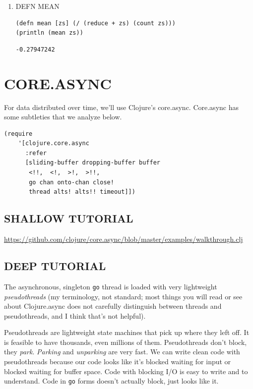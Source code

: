 \documentclass[10pt,oneside,x11names]{article}
\begin{document}
\begin{enumerate}
\item DEFN MEAN
\label{sec:org640de65}

\begin{verbatim}
(defn mean [zs] (/ (reduce + zs) (count zs)))
(println (mean zs))
\end{verbatim}

\begin{verbatim}
-0.27947242
\end{verbatim}
\end{enumerate}

\section{CORE.ASYNC}
\label{core.async}
For data distributed over time, we'll use Clojure's core.async.
Core.async has some subtleties that we analyze below.

\begin{verbatim}
(require
    '[clojure.core.async
      :refer
      [sliding-buffer dropping-buffer buffer
       <!!,  <!,  >!,  >!!,
       go chan onto-chan close!
       thread alts! alts!! timeout]])
\end{verbatim}

\subsection{SHALLOW TUTORIAL}
\label{shallow-tutorial}
\url{https://github.com/clojure/core.async/blob/master/examples/walkthrough.clj}

\subsection{DEEP TUTORIAL}
\label{deep-tutorial}
The asynchronous, singleton \texttt{go} thread is loaded with very lightweight
\emph{pseudothreads} (my terminology, not standard; most things you will read
or see about Clojure.async does not carefully distinguish between
threads and pseudothreads, and I think that's not helpful).

Pseudothreads are lightweight state machines that pick up where they
left off. It is feasible to have thousands, even millions of them.
Pseudothreads don't block, they \emph{park}. \emph{Parking} and \emph{unparking} are
very fast. We can write clean code with pseudothreads because our code
looks like it's blocked waiting for input or blocked waiting for buffer
space. Code with blocking I/O is easy to write and to understand. Code
in \texttt{go} forms doesn't actually block, just looks like it.
\end{document}
